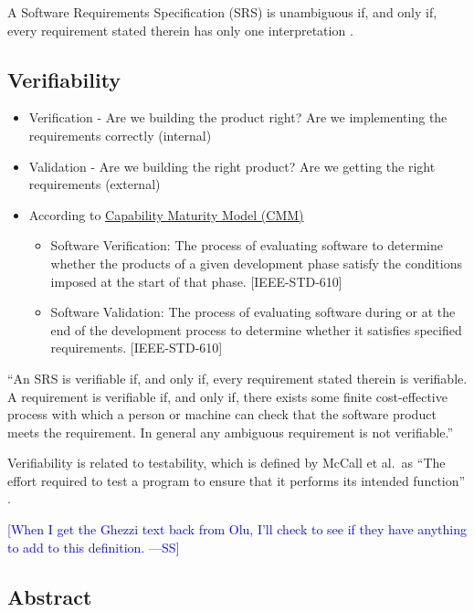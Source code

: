 \documentclass[letterpaper,cleveref]{lipics-v2019}
\newcommand{\authornote}[3]{\textcolor{#1}{[#3 ---#2]}}
\newcommand{\authornote}[3]{}
\newcommand{\wss}[1]{\authornote{blue}{SS}{#1}} %
\theoremstyle{definition}
\begin{document}
A Software Requirements Specification (SRS) is unambiguous if, and only if,
every requirement stated therein has only one interpretation \citep{IEEE1998}.

\subsection{Verifiability}

\begin{itemize}

\item Verification - Are we building the product right?  Are we implementing the
  requirements correctly (internal)
\item Validation - Are we building the right product? Are we getting the right
  requirements (external)
\item According to
  \href{https://en.wikipedia.org/wiki/Software_verification_and_validation}{Capability
    Maturity Model (CMM)}
\begin{itemize}
\item 
    Software Verification: The process of evaluating software to determine
    whether the products of a given development phase satisfy the conditions
    imposed at the start of that phase. [IEEE-STD-610]
  \item Software Validation: The process of evaluating software during or at the
    end of the development process to determine whether it satisfies specified
    requirements. [IEEE-STD-610] 
\end{itemize}
\end{itemize}

``An SRS is verifiable if, and only if, every requirement stated therein is
verifiable. A requirement is verifiable if, and only if, there exists some
finite cost-effective process with which a person or machine can check that the
software product meets the requirement. In general any ambiguous requirement is
not verifiable.'' \citep{IEEE1998}

Verifiability is related to testability, which is defined by McCall et al.\ as
``The effort required to test a program to ensure that it performs its intended
function'' \cite{VanVliet2000}.  

\wss{When I get the Ghezzi text back from Olu,
  I'll check to see if they have anything to add to this definition.}

\subsection{Abstract}
\end{document}
